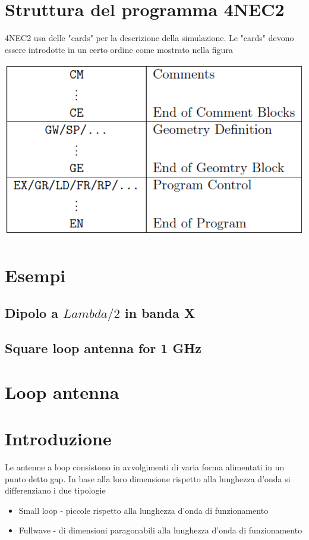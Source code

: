 \documentclass[10pt,a4paper]{book}
\begin{document}
\section{Struttura del programma 4NEC2}
4NEC2 usa delle "cards" per la descrizione della simulazione. Le "cards" devono essere introdotte in un certo ordine come mostrato nella figura

\includegraphics[scale=0.5]{img/Antenne/4NEC2_Card_Structure.png} 

\section{Esempi}
\subsection{Dipolo a $Lambda/2$ in banda X}


\subsection{Square loop antenna for 1 GHz}


\section{Loop antenna}
\section{Introduzione}
Le antenne a loop consistono in avvolgimenti di varia forma alimentati in un punto detto gap.  In base alla loro dimensione rispetto alla lunghezza d'onda si differenziano i due tipologie

\begin{itemize}
\item Small loop - piccole rispetto alla lunghezza d'onda di funzionamento
\item Fullwave  - di dimensioni paragonabili alla lunghezza d'onda di funzionamento
\end{itemize}
\end{document}
